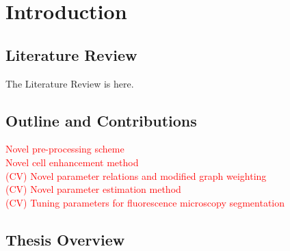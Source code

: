 
\chapter{Introduction} %

\label{chap:Chapter1} %


\newcommand{\keyword}[1]{\textbf{#1}}
\newcommand{\tabhead}[1]{\textbf{#1}}
\newcommand{\code}[1]{\texttt{#1}}
\newcommand{\file}[1]{\texttt{\bfseries#1}}
\newcommand{\option}[1]{\texttt{\itshape#1}}


\section{Literature Review}
The Literature Review is here.


\section{Outline and Contributions}
\textcolor{red}{Novel pre-processing scheme\\
	Novel cell enhancement method\\
	(CV) Novel parameter relations and modified graph weighting\\
	(CV) Novel parameter estimation method\\
	(CV) Tuning parameters for fluorescence microscopy segmentation}

\section{Thesis Overview}

